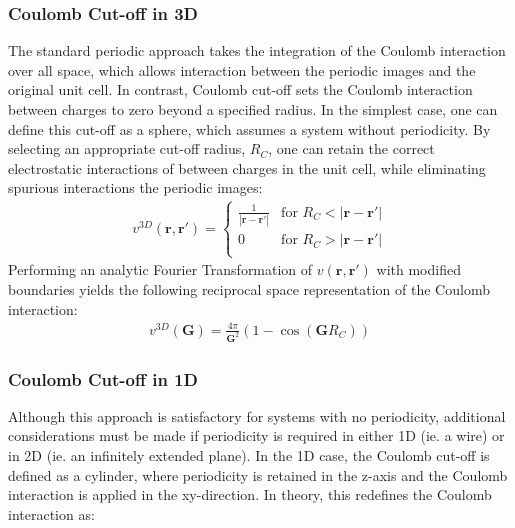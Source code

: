 \documentclass[letterpaper,10pt,english]{sphinxmanual}
\begin{document}
\subsubsection{Coulomb Cut-off in 3D}
\label{\detokenize{cutoff_coulomb:coulomb-cut-off-in-3d}}
The standard periodic approach takes the integration of the Coulomb
interaction over all space, which allows interaction between the
periodic images and the original unit cell. In contrast, Coulomb cut-off
sets the Coulomb interaction between charges to zero beyond a specified
radius. In the simplest case, one can define this cut-off as a sphere,
which assumes a system without periodicity. By selecting an appropriate
cut-off radius, \(R_C\), one can retain the correct electrostatic
interactions of between charges in the unit cell, while eliminating
spurious interactions the periodic images:
\begin{equation*}
\begin{split}v^{3D}(\mathbf{r},\mathbf{r'}) =
     \begin{cases}
      \frac{1}{|\mathbf{r} -  \mathbf{r'}|} & \text{for $R_C < |\mathbf{r} -  \mathbf{r'}|$}\\
      0 & \text{for $R_C > |\mathbf{r} -  \mathbf{r'}|$}\\
     \end{cases}\end{split}
\end{equation*}
Performing an analytic Fourier Transformation of
\(v(\mathbf{r},\mathbf{r'})\) with modified boundaries yields the
following reciprocal space representation of the Coulomb interaction:
\begin{equation*}
\begin{split}v^{3D}(\mathbf{G}) =  \frac{4 \pi}{\mathbf{G}^2}(1 - \cos(\mathbf{G}R_C))\end{split}
\end{equation*}

\subsubsection{Coulomb Cut-off in 1D}
\label{\detokenize{cutoff_coulomb:coulomb-cut-off-in-1d}}
Although this approach is satisfactory for systems with no periodicity,
additional considerations must be made if periodicity is required in
either 1D (ie. a wire) or in 2D (ie. an infinitely extended plane). In
the 1D case, the Coulomb cut-off is defined as a cylinder, where
periodicity is retained in the z-axis and the Coulomb interaction is
applied in the xy-direction. In theory, this redefines the Coulomb
interaction as:
\end{document}
